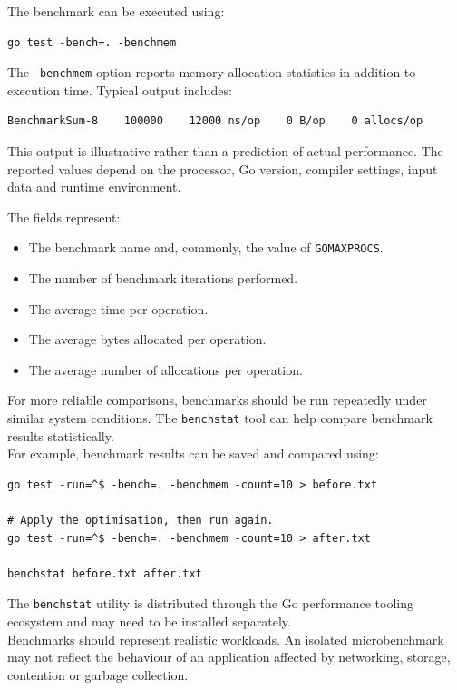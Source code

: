 The benchmark can be executed using:

\begin{lstlisting}
go test -bench=. -benchmem
\end{lstlisting}

The \texttt{-benchmem} option reports memory allocation statistics in addition to execution time. Typical output includes:

\begin{lstlisting}
BenchmarkSum-8    100000    12000 ns/op    0 B/op    0 allocs/op
\end{lstlisting}

This output is illustrative rather than a prediction of actual performance. The reported values depend on the processor, Go version, compiler settings, input data and runtime environment.

The fields represent:

\begin{itemize}
    \item The benchmark name and, commonly, the value of \texttt{GOMAXPROCS}.
    \item The number of benchmark iterations performed.
    \item The average time per operation.
    \item The average bytes allocated per operation.
    \item The average number of allocations per operation.
\end{itemize}

For more reliable comparisons, benchmarks should be run repeatedly under similar system conditions. The \texttt{benchstat} tool can help compare benchmark results statistically.\\

For example, benchmark results can be saved and compared using:

\begin{lstlisting}
go test -run=^$ -bench=. -benchmem -count=10 > before.txt

# Apply the optimisation, then run again.
go test -run=^$ -bench=. -benchmem -count=10 > after.txt

benchstat before.txt after.txt
\end{lstlisting}

The \texttt{benchstat} utility is distributed through the Go performance tooling ecosystem and may need to be installed separately.\\

Benchmarks should represent realistic workloads. An isolated microbenchmark may not reflect the behaviour of an application affected by networking, storage, contention or garbage collection.

